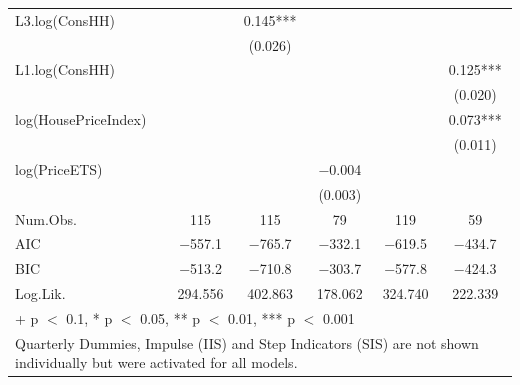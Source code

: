 \begin{table}
{\begin{tabular}[t]{lccccc}
L3.log(ConsHH) &  & \num{0.145}*** &  &  & \\
 &  & (\num{0.026}) &  &  & \\
L1.log(ConsHH) &  &  &  &  & \num{0.125}***\\
 &  &  &  &  & (\num{0.020})\\
log(HousePriceIndex) &  &  &  &  & \num{0.073}***\\
 &  &  &  &  & (\num{0.011})\\
log(PriceETS) &  &  & \num{-0.004} &  & \\
 &  &  & (\num{0.003}) &  & \\
\midrule
Num.Obs. & \num{115} & \num{115} & \num{79} & \num{119} & \num{59}\\
AIC & \num{-557.1} & \num{-765.7} & \num{-332.1} & \num{-619.5} & \num{-434.7}\\
BIC & \num{-513.2} & \num{-710.8} & \num{-303.7} & \num{-577.8} & \num{-424.3}\\
Log.Lik. & \num{294.556} & \num{402.863} & \num{178.062} & \num{324.740} & \num{222.339}\\
\bottomrule
\multicolumn{6}{l}{\rule{0pt}{1em}+ p $<$ 0.1, * p $<$ 0.05, ** p $<$ 0.01, *** p $<$ 0.001}\\
\multicolumn{6}{l}{\rule{0pt}{1em}Quarterly Dummies, Impulse (IIS) and Step Indicators (SIS) are not shown individually but were activated for all models.}\\
\end{tabular}}
\end{table}

